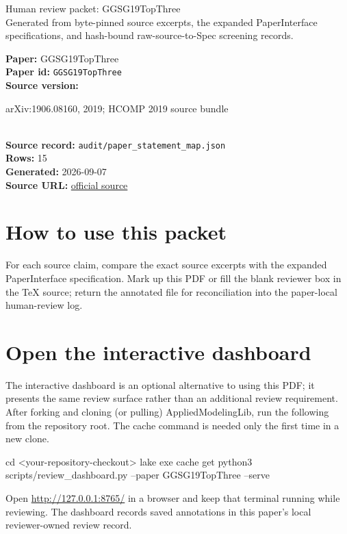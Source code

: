 \documentclass[10pt]{article}
\begin{document}
\fontsize{9}{10}\selectfont

\begin{center}
{\LARGE Human review packet: GGSG19TopThree}\\[0.35em]
\small Generated from byte-pinned source excerpts, the expanded PaperInterface
specifications, and hash-bound raw-source-to-Spec screening records.
\end{center}

\noindent\textbf{Paper:} GGSG19TopThree\\
\textbf{Paper id:} \texttt{GGSG19TopThree}\\
\textbf{Source version:} \parbox[t]{0.76\linewidth}{\raggedright arXiv:1906.08160, 2019; HCOMP 2019 source bundle}\\
\textbf{Source record:} \texttt{audit/paper\_statement\_map.json}\\
\textbf{Rows:} 15\\
\textbf{Generated:} 2026-09-07\\
\textbf{Source URL:} \href{https://arxiv.org/pdf/1906.08160}{official source}





\section*{How to use this packet}
For each source claim, compare the exact source excerpts with the expanded
PaperInterface specification. Mark up this PDF or fill the blank reviewer box in the TeX source;
return the annotated file for reconciliation into the paper-local human-review
log.

\section*{Open the interactive dashboard}
The interactive dashboard is an optional alternative to using this PDF; it
presents the same review surface rather than an additional review requirement.
After forking and cloning (or pulling) AppliedModelingLib, run the following from the
repository root. The cache command is needed only the first time in a new clone.
\begin{ReviewVerbatim}
cd <your-repository-checkout>
lake exe cache get
python3 scripts/review_dashboard.py --paper GGSG19TopThree --serve
\end{ReviewVerbatim}
Open \url{http://127.0.0.1:8765/} in a browser and keep that terminal running
while reviewing. The dashboard records saved annotations in this paper's local
reviewer-owned review record.
\end{document}
